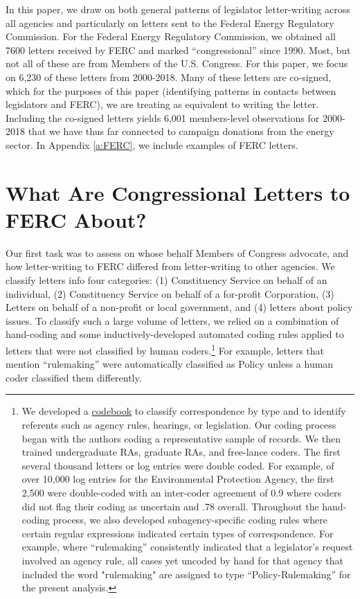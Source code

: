 \documentclass{article}
\begin{document}
In this paper, we draw on both general patterns of legislator letter-writing across all agencies and particularly on letters sent to the Federal Energy Regulatory Commission.  For the Federal Energy Regulatory Commission, we obtained all 7600 letters received by FERC and marked ``congressional'' since 1990. Most, but not all of these are from Members of the U.S. Congress. For this paper, we focus on 6,230 of these letters from 2000-2018. Many of these letters are co-signed, which for the purposes of this paper (identifying patterns in contacts between legislators and FERC), we are treating as equivalent to writing the letter.  Including the co-signed letters yields 6,001 members-level observations for 2000-2018 that we have thus far connected to campaign donations from the energy sector. In Appendix \ref{a:FERC}, we include examples of FERC letters.  

\section{What Are Congressional Letters to FERC About?}

Our first task was to assess on whose behalf Members of Congress advocate, and how letter-writing to FERC differed from letter-writing to other agencies. We classify letters info four categories: (1) Constituency Service on behalf of an individual, (2) Constituency Service on behalf of a for-profit Corporation, (3) Letters on behalf of a non-profit or local government, and  (4) letters about policy issues. To classify such a large volume of letters, we relied on a combination of hand-coding and some inductively-developed automated coding rules applied to letters that were not classified by human coders.\footnote{We developed a \href{https://docs.google.com/document/d/1fJxjXjAyRL9vX-16fSsH29anXZc-W74GMf_7BSgWkws/edit}{codebook} to classify correspondence by type and to identify referents such as agency rules, hearings, or legislation. Our coding process began with the authors coding a representative sample of records. We then trained undergraduate RAs, graduate RAs, and free-lance coders. The first several thousand letters or log entries were double coded. For example, of over 10,000 log entries for the Environmental Protection Agency, the first 2,500 were double-coded with an inter-coder agreement of 0.9 where coders did not flag their coding as uncertain and .78 overall. Throughout the hand-coding process, we also developed subagency-specific coding rules where certain regular expressions indicated certain types of correspondence. For example, where ``rulemaking'' consistently indicated that a legislator's request involved an agency rule, all cases yet uncoded by hand for that agency that included the word "rulemaking" are assigned to type ``Policy-Rulemaking'' for the present analysis.} For example, letters that mention ``rulemaking'' were automatically classified as Policy unless a human coder classified them differently.
\end{document}
